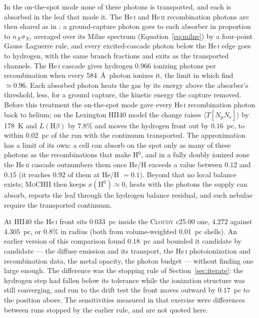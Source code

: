 \documentclass[twocolumn,linenumbers]{aastex702}
\newcommand{\MoCHII}{\textsc{MoCHII}}
\newcommand{\HeI}{He\,\textsc{i}}
\newcommand{\HeII}{He\,\textsc{ii}}
\begin{document}
In the on-the-spot mode none of these photons is transported, and
each is absorbed in the leaf that made it.  The \HeI{} and \HeII{}
recombination photons are then shared as in \citet[][Eqs.~2.24--2.25 and
\S2.5]{osterbrock2006}: a ground-capture photon goes to each absorber in
proportion to $n_X\sigma_X$, averaged over its Milne spectrum
(Equation~\ref{eq:milne}) by a four-point Gauss--Laguerre rule, and every
excited-cascade photon below the \HeI{} edge goes to hydrogen, with the same
branch fractions and exits as the transported channels.  The \HeI{}
cascade gives hydrogen 0.966 ionizing photons per recombination when every
584~\AA\ photon ionizes it, the limit in which \citet{osterbrock2006} find
$\simeq0.96$.  Each absorbed photon heats the gas by its energy above the
absorber's threshold, less, for a ground capture, the kinetic energy the
capture removed.  Before this treatment the on-the-spot mode gave every
\HeI{} recombination photon back to helium; on the Lexington HII40 model
the change raises $\langle T[N_{\mathrm{p}}N_{\mathrm{e}}]\rangle$ by
178~K and $L(\mathrm{H}\beta)$ by $7.8\%$ and moves the hydrogen front out
by $0.16$~pc, to within $0.02$~pc of the run with the continuum transported.
The approximation has a limit of its own: a cell can absorb on the spot only
as many of these photons as the recombinations that make H$^0$, and in a
fully doubly ionized zone the He\,\textsc{ii} cascade outnumbers them once
He/H exceeds a value between $0.12$ and $0.15$ (it reaches $0.92$ of them at He/H $=0.1$).
Beyond that no local balance exists; \MoCHII{} then keeps $x(\mathrm{H^0})
\approx 0$, heats with the photons the supply can absorb, reports the leaf
through the hydrogen balance residual, and such nebulae require the
transported continuum.

At HII40 the \HeI{} front sits $0.033$~pc inside the \textsc{Cloudy}
c25.00 one, $4.272$ against $4.305$~pc, or $0.8\%$ in radius (both from
volume-weighted 0.01~pc shells).  An earlier
version of this comparison found $0.18$~pc and bounded it candidate by
candidate --- the diffuse emission and its transport, the \HeI{}
photoionization and recombination data, the metal opacity, the photon
budget --- without finding one large enough.  The difference was the
stopping rule of Section~\ref{sec:iterate}: the hydrogen step had fallen
below its tolerance while the ionization structure was still converging, and
run to the drift test the front moves outward by $0.17$~pc to the position
above.  The sensitivities measured in that exercise were differences
between runs stopped by the earlier rule, and are not quoted here.
\end{document}
